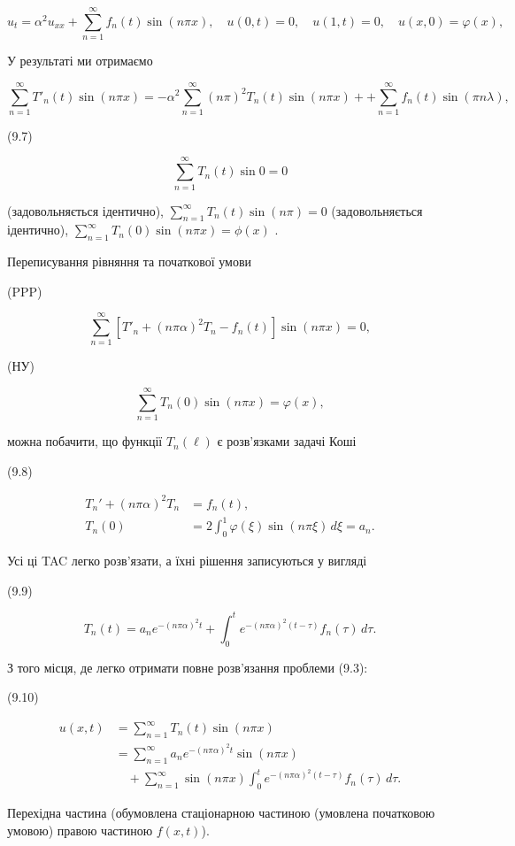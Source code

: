 \documentclass[
  ukrainian,
]{article}
\begin{document}
\[
u_{t} = \alpha^{2} u_{xx} + \sum_{n=1}^{\infty} f_{n}(t) \sin(n\pi x),
\quad u(0, t) = 0, \quad u(1, t) = 0, \quad u(x, 0) = \varphi(x),
\]

У результаті ми отримаємо

\[
\sum_{n=1}^{\infty} T'_n(t) \sin(n\pi x) = -\alpha^2 \sum_{n=1}^{\infty} (n\pi)^2 T_n(t) \sin(n\pi x) + + \sum_{n=1}^{\infty} f_n(t) \sin(\pi n\lambda),
\]

(9.7)

\[
\sum_{n=1}^{\infty} T_n(t) \sin 0 = 0
\]

(задовольняється ідентично),
\(\sum_{n=1}^{\infty} T_n(t) \sin (n\pi) = 0\) (задовольняється
ідентично), \(\sum_{n=1}^{\infty} T_n(0) \sin (n\pi x) = \phi(x)\) .

Переписування рівняння та початкової умови

(PPP)

\[
\sum_{n=1}^{\infty} [T'_n + (n\pi\alpha)^2 T_n - f_n(t)] \sin(n\pi x) = 0,
\]

(НУ)

\[
\sum_{n=1}^{\infty} T_n(0) \sin(n\pi x) = \varphi(x),
\]

можна побачити, що функції \(T_n(\ell)\) є розв'язками задачі Коші

(9.8)

\[
\begin{aligned}
T_n' + (n\pi\alpha)^2 T_n &= f_n(t), \\
T_n(0) &= 2 \int_0^1 \varphi(\xi)\sin(n\pi \xi)\,d\xi = a_n.
\end{aligned}
\]

Усі ці TAC легко розв'язати, а їхні рішення записуються у вигляді

(9.9)

\[
T_n(t) = a_n e^{-(n\pi\alpha)^2 t} + \int_0^t e^{-(n\pi\alpha)^2 (t-\tau)} f_n(\tau)\,d\tau.
\]

З того місця, де легко отримати повне розв'язання проблеми (9.3):

(9.10)

\[
\begin{aligned}
u(x, t) &= \sum_{n=1}^{\infty} T_n(t)\sin(n\pi x) \\
&= \sum_{n=1}^{\infty} a_n e^{-(n\pi\alpha)^2 t}\sin(n\pi x) \\
&\quad + \sum_{n=1}^{\infty} \sin(n\pi x)\int_0^t e^{-(n\pi\alpha)^2 (t-\tau)} f_n(\tau)\,d\tau.
\end{aligned}
\]

Перехідна частина (обумовлена стаціонарною частиною (умовлена початковою
умовою) правою частиною \(f(x, t)\)).
\end{document}
